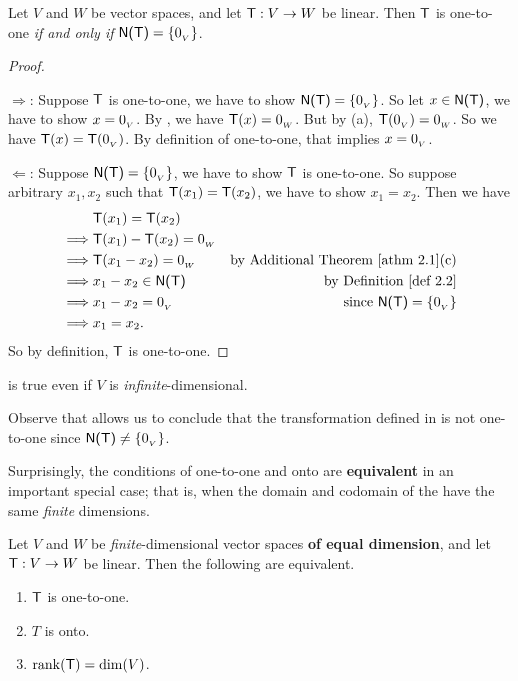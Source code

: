 \begin{theorem} \label{thm 2.4}
Let \(V\) and \(W\) be vector spaces, and let \(\textsf{T} : V \to W\) be linear.
Then \(\textsf{T}\) is one-to-one \emph{if and only if} \(\textsf{N(T)} = \{ 0_{_V} \}\).
\end{theorem}

\begin{proof} \ 

\(\Longrightarrow\): Suppose \(\textsf{T}\) is one-to-one, we have to show \(\textsf{N(T)} = \{ 0_{_V} \}\).
So let \(x \in \textsf{N(T)}\), we have to show \(x = 0_{_V}\).
By , we have \(\textsf{T}(x) = 0_{_W}\).
But by (a), \(\textsf{T}(0_{_V}) = 0_{_W}\).
So we have \(\textsf{T}(x) = \textsf{T}(0_{_V})\).
By definition of one-to-one, that implies \(x = 0_{_V}\).

\(\Longleftarrow\):
Suppose \(\textsf{N(T)} = \{ 0_{_V} \}\), we have to show \(\textsf{T}\) is one-to-one.
So suppose arbitrary \(x_1, x_2\) such that \(\textsf{T}(x_1) = \textsf{T}(x_2)\), we have to show \(x_1 = x_2\).
Then we have
\begin{align*}
             & \T(x_1) = \T(x_2) \\
    \implies & \T(x_1) - \T(x_2) = \OW \\
    \implies & \T(x_1 - x_2) = \OW & \text{by \ATHM{2.1}(c)} \\
    \implies & x_1 - x_2 \in \NULLT & \text{by \DEF{2.2}} \\
    \implies & x_1 - x_2 = \OV & \text{since \(\NULLT = \{ \OV \}\)} \\
    \implies & x_1 = x_2.
\end{align*}
So by definition, \(\textsf{T}\) is one-to-one.
\end{proof}

\begin{remark} \label{remark 2.1.9}
 is true even if \(V\) is \emph{infinite}-dimensional.
\end{remark}

\begin{note}
Observe that  allows us to conclude that the transformation defined in  is not one-to-one since \(\textsf{N(T)} \ne \{ 0_{_V} \}\).
\end{note}

Surprisingly, the conditions of one-to-one and onto are \textbf{equivalent} in an important special case; that is, when the domain and codomain of the \LTRAN{} have the same \emph{finite} dimensions.

\begin{theorem} \label{thm 2.5}
Let \(V\) and \(W\) be \emph{finite}-dimensional vector spaces \textbf{of equal dimension}, and let \(\textsf{T} : V \to W\) be linear.
Then the following are equivalent.
\begin{enumerate}
\item \(\textsf{T}\) is one-to-one.
\item \(T\) is onto.
\item \(\mathrm{rank}(\textsf{T}) = \dim(V)\).
\end{enumerate}
\end{theorem}

